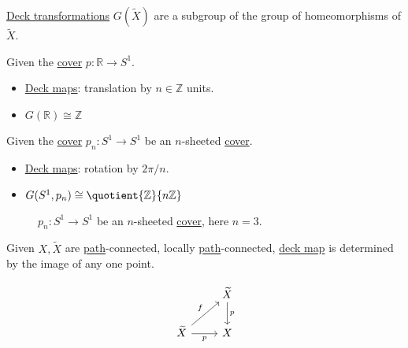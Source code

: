 \begin{eg}
	\hyperref[def:deck-transformation]{Deck transformations} \(G(\widetilde{X} )\) are a subgroup of the group of homeomorphisms of \(\widetilde{X} \).
\end{eg}

\begin{eg}
	Given the \hyperref[def:covering-map]{cover} \(p\colon \mathbb{R} \to S^1\).
	\begin{itemize}
		\item \hyperref[def:deck-transformation]{Deck maps}: translation by \(n\in \mathbb{Z} \) units.
		\item \(G(\mathbb{R} )\cong \mathbb{Z} \)
	\end{itemize}
\end{eg}
\begin{eg}
	Given the \hyperref[def:covering-map]{cover} \(p_{n}\colon S^{1}\to S^1\) be an \(n\)-sheeted \hyperref[def:covering-map]{cover}.
	\begin{itemize}
		\item \hyperref[def:deck-transformation]{Deck maps}: rotation by \(2\pi / n\).
		\item \(G(S^1, p_{n})\cong \quotient{\mathbb{Z} }{n \mathbb{Z} } \)
	\end{itemize}
	\begin{figure}[H]
		\centering
		\caption{\(p_{n} \colon S^1 \to S^1\) be an \(n\)-sheeted \hyperref[def:covering-map]{cover}, here \(n = 3\).}
		\label{fig:eg:lec17:N-sheeted-cover}
	\end{figure}
\end{eg}

\begin{exercise}\label{ex:lec17}
	Given \(X, \widetilde{X} \) are \hyperref[def:path]{path}-connected, locally \hyperref[def:path]{path}-connected,
	\hyperref[def:deck-transformation]{deck map} is determined by the image of any one point.
\end{exercise}
\begin{answer}
	\[
		\begin{tikzcd}
			& {\widetilde{X}} \\
			{\widetilde{X}} & X
			\arrow["f", from=2-1, to=1-2]
			\arrow["p"', from=2-1, to=2-2]
			\arrow["p", from=1-2, to=2-2]
		\end{tikzcd}
	\]
\end{answer}

